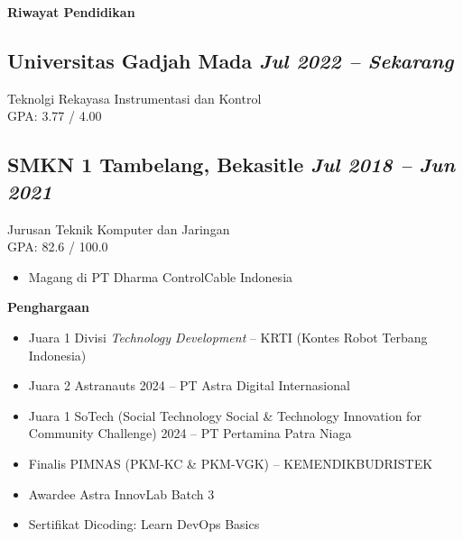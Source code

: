 \documentclass[a4paper,11pt]{article}
\begin{document}
	
	\vspace{1em}
	\begin{center}
		{\large\bfseries Riwayat Pendidikan}\\[-0.6em]
		\noindent\makebox[\linewidth]{\rule{\textwidth}{0.4pt}}
	\end{center}
	
	\subsection{Universitas Gadjah Mada \hfill \textnormal{\textit{Jul 2022 – Sekarang}}}
	Teknolgi Rekayasa Instrumentasi dan Kontrol \\
	GPA: 3.77 / 4.00
	
	\subsection{SMKN 1 Tambelang, Bekasitle \hfill \textnormal{\textit{Jul 2018 – Jun 2021}}}
	Jurusan Teknik Komputer dan Jaringan \\
	GPA: 82.6 / 100.0
	\begin{itemize}
		\item Magang di PT Dharma ControlCable Indonesia
	\end{itemize}
	
	\vspace{1em}
	\begin{center}
		{\large\bfseries Penghargaan}\\[-0.6em]
		\noindent\makebox[\linewidth]{\rule{\textwidth}{0.4pt}}
	\end{center}

	\begin{itemize}
		\item Juara 1 Divisi \textit{Technology Development} – KRTI (Kontes Robot Terbang Indonesia)
		\item Juara 2 Astranauts 2024 – PT Astra Digital Internasional
		\item Juara 1 SoTech (Social Technology Social \& Technology Innovation for Community Challenge) 2024 – PT Pertamina Patra Niaga
		\item Finalis PIMNAS (PKM-KC \& PKM-VGK) – KEMENDIKBUDRISTEK
		\item Awardee Astra InnovLab Batch 3
		\item Sertifikat Dicoding: Learn DevOps Basics
	\end{itemize}
	
\end{document}
